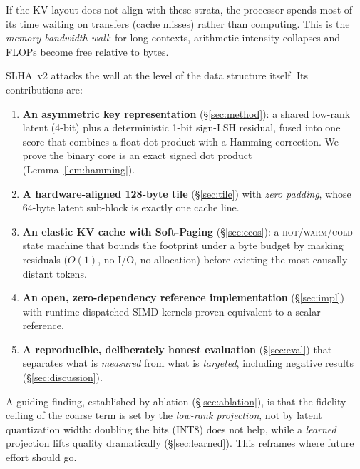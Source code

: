 \documentclass[11pt]{article}
\theoremstyle{plain}
\theoremstyle{definition}
\begin{document}
If the KV layout does not align with these strata, the processor spends
most of its time waiting on transfers (cache misses) rather than
computing. This is the \emph{memory-bandwidth wall}: for long contexts,
arithmetic intensity collapses and FLOPs become free relative to bytes.

SLHA~v2 attacks the wall at the level of the data structure itself. Its
contributions are:

\begin{enumerate}[leftmargin=1.6em,itemsep=2pt]
  \item \textbf{An asymmetric key representation} (\S\ref{sec:method}):
    a shared low-rank latent (4-bit) plus a deterministic 1-bit
    sign-LSH residual, fused into one score that combines a float dot
    product with a Hamming correction. We prove the binary core is an
    exact signed dot product (Lemma~\ref{lem:hamming}).
  \item \textbf{A hardware-aligned 128-byte tile}
    (\S\ref{sec:tile}) with \emph{zero padding}, whose 64-byte latent
    sub-block is exactly one cache line.
  \item \textbf{An elastic KV cache with Soft-Paging}
    (\S\ref{sec:ccos}): a \textsc{hot}/\textsc{warm}/\textsc{cold}
    state machine that bounds the footprint under a byte budget by
    masking residuals ($O(1)$, no I/O, no allocation) before evicting
    the most causally distant tokens.
  \item \textbf{An open, zero-dependency reference implementation}
    (\S\ref{sec:impl}) with runtime-dispatched SIMD kernels proven
    equivalent to a scalar reference.
  \item \textbf{A reproducible, deliberately honest evaluation}
    (\S\ref{sec:eval}) that separates what is \emph{measured} from what
    is \emph{targeted}, including negative results
    (\S\ref{sec:discussion}).
\end{enumerate}

A guiding finding, established by ablation (\S\ref{sec:ablation}), is
that the fidelity ceiling of the coarse term is set by the
\emph{low-rank projection}, not by latent quantization width: doubling
the bits (INT8) does not help, while a \emph{learned} projection lifts
quality dramatically (\S\ref{sec:learned}). This reframes where future
effort should go.
\end{document}
